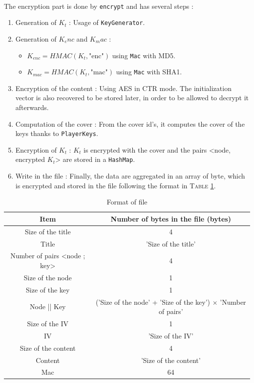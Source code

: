 \documentclass[a4paper,titlepage]{article}
\begin{document}
\paragraph{}
The encryption part is done by \texttt{encrypt} and has several steps : 
\begin{enumerate}
	\item Generation of $K_t$ : Usage of \texttt{KeyGenerator}.
	
	\item Generation of $K_enc$ and $K_mac$ : 
	\begin{itemize}	
		\item $K_{enc} = HMAC(K_t, \text{"enc"})$ using \texttt{Mac} with MD5.
		\item $K_{mac} = HMAC(K_t, \text{"mac"})$ using \texttt{Mac} with SHA1. 
	\end{itemize}
	
	\item Encryption of the content : Using AES in CTR mode. The initialization vector is also recovered to be stored later, in order to be allowed to decrypt it afterwards. 
	
	\item Computation of the cover : From the cover id's, it computes the cover of the keys thanks to \texttt{PlayerKeys}.

	\item Encryption of $K_t$ : $K_t$ is encrypted with the cover and the pairs <node, encrypted $K_t$> are stored in a \texttt{HashMap}.

	\item Write in the file : Finally, the data are aggregated in an array of byte, which is encrypted and stored in the file following the format in \textsc{Table} \ref{format}.
\end{enumerate}

\renewcommand{\arraystretch}{1.6}
\begin{table}[h]
	\center
	\begin{tabular}{|c|c|}
		\hline
		\textbf{Item} & \textbf{Number of bytes in the file (bytes)}\\
		\hline
		Size of the title & 4\\
		\hline
		Title & 'Size of the title'\\
		\hline
		Number of pairs <node ; key> & 4\\
		\hline
		Size of the node & 1\\
		\hline
		Size of the key & 1\\
		\hline
		Node || Key & ('Size of the node' + 'Size of the key') $\times$ 'Number of pairs'\\
		\hline
		Size of the IV & 1\\
		\hline
		IV & 'Size of the IV'\\
		\hline
		Size of the content & 4\\
		\hline
		Content & 'Size of the content'\\
		\hline
		Mac & 64\\ 
		\hline
	\end{tabular}
	\caption{Format of file}
	\label{format}
\end{table}
\end{document}
